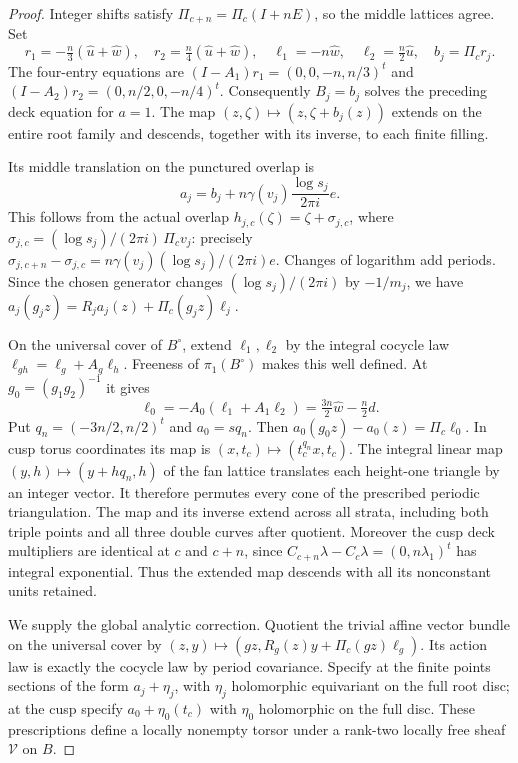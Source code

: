 \begin{proof}
Integer shifts satisfy $\Pi_{c+n}=\Pi_c(I+nE)$, so the middle lattices agree. Set
\[
 r_1=-\tfrac n3(\widehat u+\widehat w),\quad
 r_2=\tfrac n4(\widehat u+\widehat w),\quad
 \ell_1=-n\widehat w,\quad \ell_2=\tfrac n2\widehat u,\quad b_j=\Pi_cr_j.
\]
The four-entry equations are $(I-A_1)r_1=(0,0,-n,n/3)^t$ and $(I-A_2)r_2=(0,n/2,0,-n/4)^t$. Consequently $B_j=b_j$ solves the preceding deck equation for $a=1$. The map $(z,\zeta)\mapsto(z,\zeta+b_j(z))$ extends on the entire root family and descends, together with its inverse, to each finite filling.

Its middle translation on the punctured overlap is
\[
 a_j=b_j+n\gamma(v_j)\frac{\log s_j}{2\pi i}e.
\]
This follows from the actual overlap $h_{j,c}(\zeta)=\zeta+\sigma_{j,c}$, where $\sigma_{j,c}=(\log s_j)/(2\pi i)\,\Pi_cv_j$: precisely $\sigma_{j,c+n}-\sigma_{j,c}=n\gamma(v_j)(\log s_j)/(2\pi i)e$. Changes of logarithm add periods. Since the chosen generator changes $(\log s_j)/(2\pi i)$ by $-1/m_j$, we have $a_j(g_jz)=R_ja_j(z)+\Pi_c(g_jz)\ell_j$.

On the universal cover of $B^\circ$, extend $\ell_1,\ell_2$ by the integral cocycle law $\ell_{gh}=\ell_g+A_g\ell_h$. Freeness of $\pi_1(B^\circ)$ makes this well defined. At $g_0=(g_1g_2)^{-1}$ it gives
\[
 \ell_0=-A_0(\ell_1+A_1\ell_2)=\tfrac{3n}2\widehat w-\tfrac n2d.
\]
Put $q_n=(-3n/2,n/2)^t$ and $a_0=sq_n$. Then $a_0(g_0z)-a_0(z)=\Pi_c\ell_0$. In cusp torus coordinates its map is $(x,t_c)\mapsto(t_c^{q_n}x,t_c)$. The integral linear map $(y,h)\mapsto(y+hq_n,h)$ of the fan lattice translates each height-one triangle by an integer vector. It therefore permutes every cone of the prescribed periodic triangulation. The map and its inverse extend across all strata, including both triple points and all three double curves after quotient. Moreover the cusp deck multipliers are identical at $c$ and $c+n$, since $C_{c+n}\lambda-C_c\lambda=(0,n\lambda_1)^t$ has integral exponential. Thus the extended map descends with all its nonconstant units retained.

We supply the global analytic correction. Quotient the trivial affine vector bundle on the universal cover by
$(z,y)\mapsto(gz,R_g(z)y+\Pi_c(gz)\ell_g)$. Its action law is exactly the cocycle law by period covariance. Specify at the finite points sections of the form $a_j+\eta_j$, with $\eta_j$ holomorphic equivariant on the full root disc; at the cusp specify $a_0+\eta_0(t_c)$ with $\eta_0$ holomorphic on the full disc. These prescriptions define a locally nonempty torsor under a rank-two locally free sheaf $\mathcal V$ on $B$.


\end{proof}
